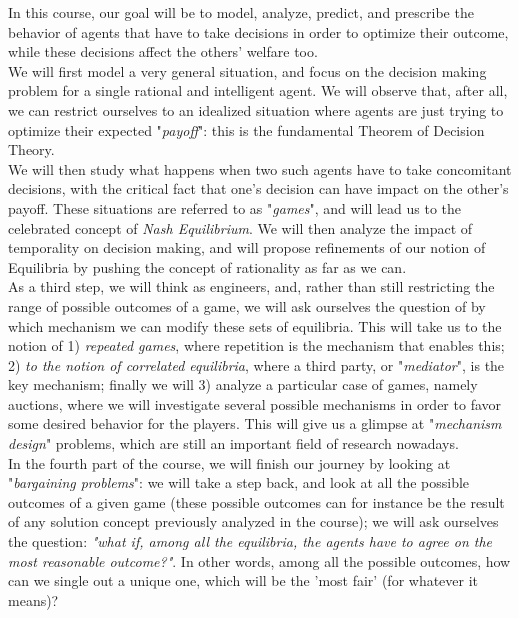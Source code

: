 In this course, our goal will be to model, analyze, predict, and prescribe the behavior of agents that have to take decisions in order to optimize their outcome, while these decisions affect the others' welfare too.  \\
We will first model a very general situation, and focus on the decision making problem for a single rational and intelligent agent. We will observe that, after all, we can restrict ourselves to an idealized situation where agents are just trying to optimize their expected "\emph{payoff}": this is the fundamental Theorem of Decision Theory. \\
We will then study what happens when two such agents have to take concomitant decisions, with the critical fact that one's decision can have impact on the other's payoff. These situations are referred to as "\emph{games}", and will lead us to the celebrated concept of \emph{Nash Equilibrium}.
We will then analyze the impact of temporality on decision making, and will propose refinements of our notion of Equilibria by pushing the concept of rationality as far as we can.  \\
As a third step, we will think as engineers, and, rather than still restricting the range of possible outcomes of a game, we will ask ourselves the question of by which mechanism we can modify these sets of equilibria.  This will take us to the notion of 1) \emph{repeated games}, where repetition is the mechanism that enables this; 2) \emph{to the notion of correlated equilibria}, where a third party, or "\emph{mediator}", is the key mechanism; finally we will 3) analyze a particular case of games, namely auctions, where we will investigate several possible mechanisms in order to favor some desired behavior for the players.  This will give us a glimpse at "\emph{mechanism design}" problems, which are still an important field of research nowadays.  \\
In the fourth part of the course, we will finish our journey by looking at "\emph{bargaining problems}": we will take a step back, and look at all the possible outcomes of a given game (these possible outcomes can for instance be the result of any solution concept previously analyzed in the course); we will ask ourselves the question: \emph{"what if, among all the equilibria, the agents have to agree on the most reasonable outcome?"}.  In other words, among all the possible outcomes, how can we single out a unique one, which will be the 'most fair' (for whatever it means)?


